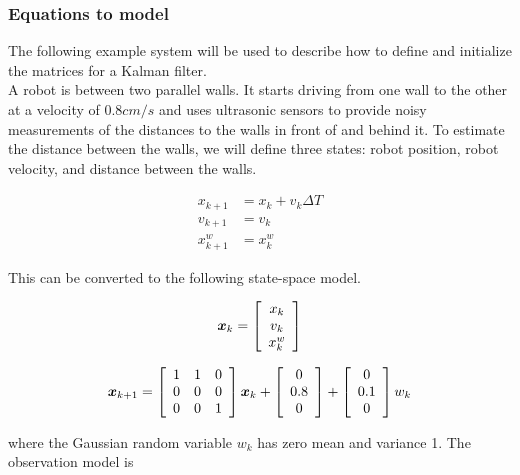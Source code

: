 \subsubsection{Equations to model}

The following example system will be used to describe how to define and
initialize the matrices for a Kalman filter. \\

A robot is between two parallel walls. It starts driving from one wall to the
other at a velocity of $0.8 cm/s$ and uses ultrasonic sensors to provide noisy
measurements of the distances to the walls in front of and behind it. To
estimate the distance between the walls, we will define three states: robot
position, robot velocity, and distance between the walls.

\begin{align}
  x_{k+1} &= x_k + v_k \Delta T \\
  v_{k+1} &= v_k \\
  x_{k+1}^w &= x_k^w
\end{align}

This can be converted to the following state-space \gls{model}.

\begin{equation}
  \bm x_k = \left[
  \begin{array}{c}
    x_k \\
    v_k \\
    x_k^w
  \end{array} \right]
\end{equation}

\begin{equation}
  \bm x_{k+1} = \left[
  \begin{array}{ccc}
    1 & 1 & 0 \\
    0 & 0 & 0 \\
    0 & 0 & 1
  \end{array} \right] \bm x_k + \left[
  \begin{array}{c}
    0 \\
    0.8 \\
    0
  \end{array} \right] + \left[
  \begin{array}{c}
    0 \\
    0.1 \\
    0
  \end{array} \right] w_k
\end{equation}

where the Gaussian random variable $w_k$ has zero mean and variance 1. The
observation \gls{model} is

